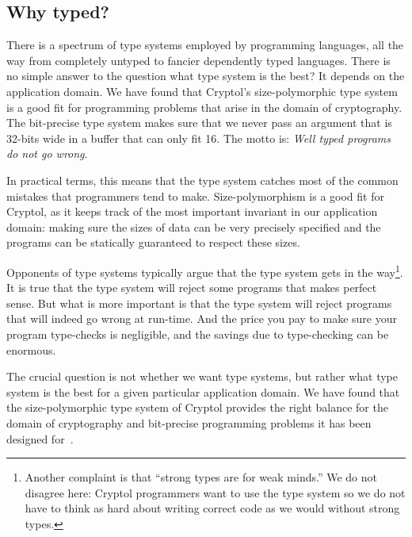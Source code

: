 \subsection{Why typed?}
\label{sec:why-typed}

There is a spectrum of type systems employed by programming languages,
all the way from completely untyped to fancier dependently typed
languages.  There is no simple answer to the question what type system
is the best? It depends on the application domain. We have found that
Cryptol's size-polymorphic type system is a good fit for programming
problems that arise in the domain of cryptography. The bit-precise
type system makes sure that we never pass an argument that is 32-bits
wide in a buffer that can only fit 16. The motto is: {\em Well typed
  programs do not go wrong}. 

In practical terms, this means that the type system catches most of
the common mistakes that programmers tend to make. Size-polymorphism
is a good fit for Cryptol, as it keeps track of the most important
invariant in our application domain: making sure the sizes of data can
be very precisely specified and the programs can be statically
guaranteed to respect these sizes.

Opponents of type systems typically argue that the type system gets in
the way\footnote{Another complaint is that ``strong types are for
  weak minds.'' We do not disagree here: Cryptol programmers want to
  use the type system so we do not have to think as hard about writing
  correct code as we would without strong types.}.  It is true that
the type system will reject some programs that makes perfect
sense. But what is more important is that the type system will reject
programs that will indeed go wrong at run-time. And the price you pay
to make sure your program type-checks is negligible, and the savings
due to type-checking can be enormous.  

The crucial question is not whether we want type systems, but rather
what type system is the best for a given particular application
domain. We have found that the size-polymorphic type system of Cryptol
provides the right balance for the domain of cryptography and
bit-precise programming problems it has been designed
for~\cite{lewis2003}.


